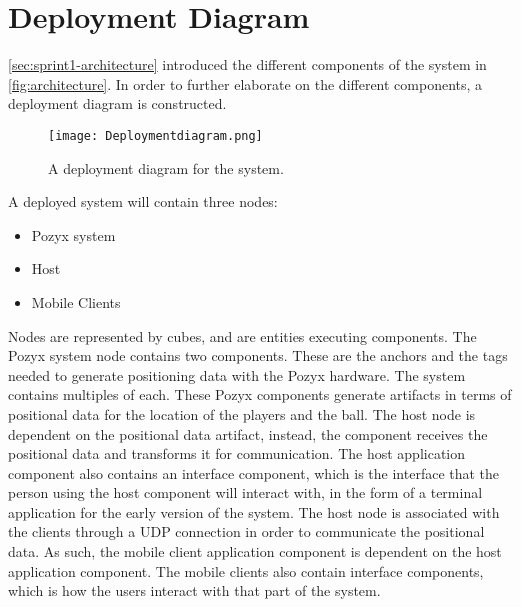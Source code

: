 \section{Deployment Diagram}\label{sec:sprint2-deploymentdia}
\autoref{sec:sprint1-architecture} introduced the different components of the system in \autoref{fig:architecture}.
In order to further elaborate on the different components, a deployment diagram is constructed.
\begin{figure}[H]
    \centering
    \texttt{[image: Deploymentdiagram.png]}
    \caption{A deployment diagram for the system.}
    \label{fig:sprint2-deployment}
\end{figure}
\noindent
A deployed system will contain three nodes:
\begin{itemize}
    \item Pozyx system
    \item Host
    \item Mobile Clients
\end{itemize}
Nodes are represented by cubes, and are entities executing components.
The Pozyx system node contains two components.
These are the anchors and the tags needed to generate positioning data with the Pozyx hardware.
The system contains multiples of each.
These Pozyx components generate artifacts in terms of positional data for the location of the players and the ball.
The host node is dependent on the positional data artifact, instead, the component receives the positional data and transforms it for communication.
The host application component also contains an interface component, which is the interface that the person using the host component will interact with, in the form of a terminal application for the early version of the system.
The host node is associated with the clients through a UDP connection in order to communicate the positional data.
As such, the mobile client application component is dependent on the host application component.
The mobile clients also contain interface components, which is how the users interact with that part of the system.
